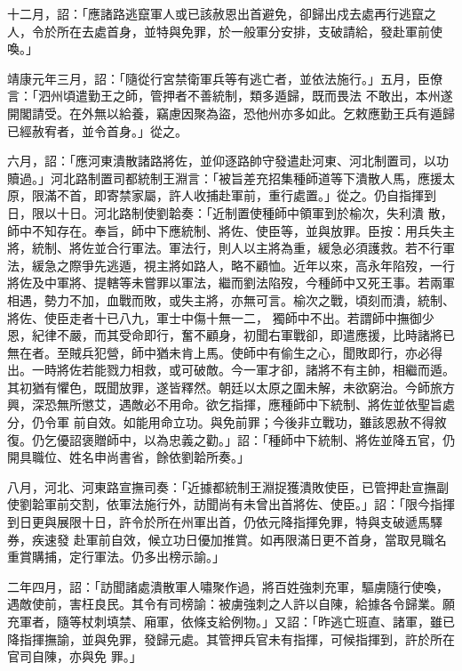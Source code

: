 \begin{pinyinscope}
 十二月，詔：「應諸路逃竄軍人或已該赦恩出首避免，卻歸出戍去處再行逃竄之人，令於所在去處首身，並特與免罪，於一般軍分安排，支破請給，發赴軍前使喚。」



 靖康元年三月，詔：「隨從行宮禁衛軍兵等有逃亡者，並依法施行。」五月，臣僚言：「泗州頃遣勤王之師，管押者不善統制，類多遁歸，既而畏法
 不敢出，本州遂開閣請受。在外無以給養，竊慮因聚為盜，恐他州亦多如此。乞敕應勤王兵有遁歸已經赦宥者，並令首身。」從之。



 六月，詔：「應河東潰散諸路將佐，並仰逐路帥守發遣赴河東、河北制置司，以功贖過。」河北路制置司都統制王淵言：「被旨差充招集種師道等下潰散人馬，應援太原，限滿不首，即寄禁家屬，許人收捕赴軍前，重行處置。」從之。仍自指揮到日，限以十日。河北路制使劉韐奏：「近制置使種師中領軍到於榆次，失利潰
 散，師中不知存在。奉旨，師中下應統制、將佐、使臣等，並與放罪。臣按：用兵失主將，統制、將佐並合行軍法。軍法行，則人以主將為重，緩急必須護救。若不行軍法，緩急之際爭先逃遁，視主將如路人，略不顧恤。近年以來，高永年陷歿，一行將佐及中軍將、提轄等未嘗罪以軍法，繼而劉法陷歿，今種師中又死王事。若兩軍相遇，勢力不加，血戰而敗，或失主將，亦無可言。榆次之戰，頃刻而潰，統制、將佐、使臣走者十已八九，軍士中傷十無一二，
 獨師中不出。若謂師中撫御少恩，紀律不嚴，而其受命即行，奮不顧身，初聞右軍戰卻，即遣應援，比時諸將已無在者。至賊兵犯營，師中猶未肯上馬。使師中有偷生之心，聞敗即行，亦必得出。一時將佐若能戮力相救，或可破敵。今一軍才卻，諸將不有主帥，相繼而遁。其初猶有懼色，既聞放罪，遂皆釋然。朝廷以太原之圍未解，未欲窮治。今師旅方興，深恐無所懲艾，遇敵必不用命。欲乞指揮，應種師中下統制、將佐並依聖旨處分，仍令軍
 前自效。如能用命立功。與免前罪；今後非立戰功，雖該恩赦不得敘復。仍乞優詔褒贈師中，以為忠義之勸。」詔：「種師中下統制、將佐並降五官，仍開具職位、姓名申尚書省，餘依劉韐所奏。」



 八月，河北、河東路宣撫司奏：「近據都統制王淵捉獲潰敗使臣，已管押赴宣撫副使劉韐軍前交割，依軍法施行外，訪聞尚有未曾出首將佐、使臣。」詔：「限今指揮到日更與展限十日，許令於所在州軍出首，仍依元降指揮免罪，特與支破遞馬驛券，疾速發
 赴軍前自效，候立功日優加推賞。如再限滿日更不首身，當取見職名重賞購捕，定行軍法。仍多出榜示諭。」



 二年四月，詔：「訪聞諸處潰散軍人嘯聚作過，將百姓強刺充軍，驅虜隨行使喚，遇敵使前，害枉良民。其令有司榜諭：被虜強刺之人許以自陳，給據各令歸業。願充軍者，隨等杖刺填禁、廂軍，依條支給例物。」又詔：「昨逃亡班直、諸軍，雖已降指揮撫諭，並與免罪，發歸元處。其管押兵官未有指揮，可候指揮到，許於所在官司自陳，亦與免
 罪。」




\end{pinyinscope}
